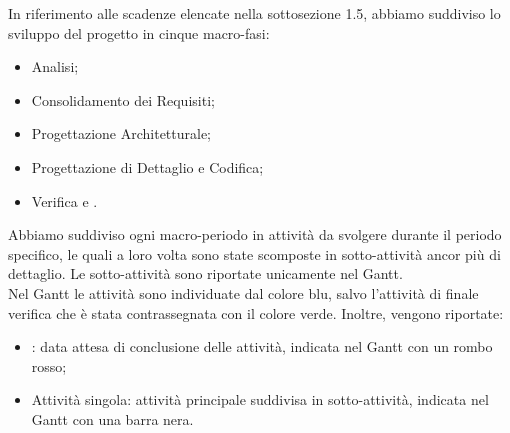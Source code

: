 In riferimento alle scadenze elencate nella sottosezione 1.5, abbiamo suddiviso lo sviluppo del progetto in cinque macro-fasi:
\begin{itemize}
\item{Analisi;}
\item{Consolidamento dei Requisiti;}
\item{Progettazione Architetturale;}
\item{Progettazione di Dettaglio e Codifica;}
\item{Verifica e .}
\end{itemize}

Abbiamo suddiviso ogni macro-periodo in attività da svolgere durante il periodo specifico, le quali a loro volta sono state scomposte in sotto-attività ancor più di dettaglio. Le sotto-attività sono riportate unicamente nel Gantt. \\ Nel Gantt le attività sono individuate dal colore blu, salvo l'attività di finale verifica che è stata contrassegnata con il colore verde. Inoltre, vengono riportate:
\begin{itemize}
\item{: data attesa di conclusione delle attività, indicata nel Gantt con un rombo rosso;}
\item{Attività singola: attività principale suddivisa in sotto-attività, indicata nel Gantt con una barra nera.}
\end{itemize}






\pagebreak
